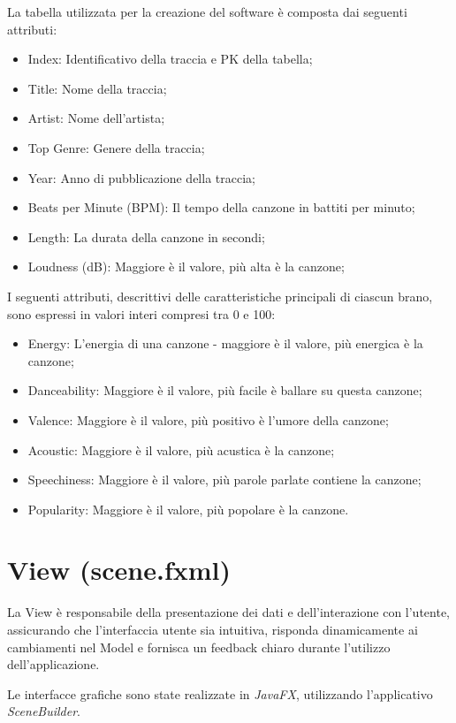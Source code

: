 \documentclass[12pt, a4paper]{article}
\begin{document}
La tabella utilizzata per la creazione del software è composta dai seguenti attributi:
\begin{itemize}
\item Index: Identificativo della traccia e PK della tabella;
\item Title: Nome della traccia;
\item Artist: Nome dell'artista;
\item Top Genre: Genere della traccia;
\item Year: Anno di pubblicazione della traccia;
\item Beats per Minute (BPM): Il tempo della canzone in battiti per minuto;
\item Length: La durata della canzone in secondi;
\item Loudness (dB): Maggiore è il valore, più alta è la canzone;
\end{itemize}
I seguenti attributi, descrittivi delle caratteristiche principali di ciascun brano, sono espressi in valori interi compresi tra 0 e 100:
\begin{itemize}
\item Energy: L'energia di una canzone - maggiore è il valore, più energica è la canzone;
\item Danceability: Maggiore è il valore, più facile è ballare su questa canzone;
\item Valence: Maggiore è il valore, più positivo è l'umore della canzone;
\item Acoustic: Maggiore è il valore, più acustica è la canzone;
\item Speechiness: Maggiore è il valore, più parole parlate contiene la canzone;
\item Popularity: Maggiore è il valore, più popolare è la canzone.
\end{itemize}

\newpage
\section{View (scene.fxml)}

La View è responsabile della presentazione dei dati e dell'interazione con l'utente, assicurando che l'interfaccia utente sia intuitiva, risponda dinamicamente ai cambiamenti nel Model e fornisca un feedback chiaro durante l'utilizzo dell'applicazione.

Le interfacce grafiche sono state realizzate in \textit{JavaFX}, utilizzando l’applicativo \newline \textit{SceneBuilder}. 
\end{document}
